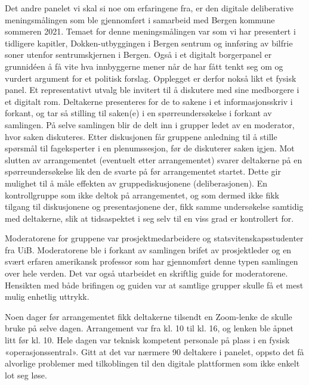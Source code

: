 \documentclass[
  12pt,
  a4paper, 12pt]{article}
\begin{document}
Det andre panelet vi skal si noe om erfaringene fra, er den digitale deliberative meningsmålingen som ble gjennomført i samarbeid med Bergen kommune sommeren 2021. Temaet for denne meningsmålingen var som vi har presentert i tidligere kapitler, Dokken-utbyggingen i Bergen sentrum og innføring av bilfrie soner utenfor sentrumskjernen i Bergen. Også i et digitalt borgerpanel er grunnidéen å få vite hva innbyggerne mener når de har fått tenkt seg om og vurdert argument for et politisk forslag. Opplegget er derfor nokså likt et fysisk panel. Et representativt utvalg ble invitert til å diskutere med sine medborgere i et digitalt rom. Deltakerne presenteres for de to sakene i et informasjonsskriv i forkant, og tar så stilling til saken(e) i en spørreundersøkelse i forkant av samlingen. På selve samlingen blir de delt inn i grupper ledet av en moderator, hvor saken diskuteres. Etter diskusjonen får gruppene anledning til å stille spørsmål til fageksperter i en plenumssesjon, før de diskuterer saken igjen. Mot slutten av arrangementet (eventuelt etter arrangementet) svarer deltakerne på en spørreundersøkelse lik den de svarte på før arrangementet startet. Dette gir mulighet til å måle effekten av gruppediskusjonene (deliberasjonen). En kontrollgruppe som ikke deltok på arrangementet, og som dermed ikke fikk tilgang til diskusjonene og presentasjonene der, fikk samme undersøkelse samtidig med deltakerne, slik at tidsaspektet i seg selv til en viss grad er kontrollert for.

Moderatorene for gruppene var prosjektmedarbeidere og statsvitenskapsstudenter fra UiB. Moderatorene ble i forkant av samlingen brifet av prosjektleder og en svært erfaren amerikansk professor som har gjennomført denne typen samlingen over hele verden. Det var også utarbeidet en skriftlig guide for moderatorene. Hensikten med både brifingen og guiden var at samtlige grupper skulle få et mest mulig enhetlig uttrykk.

Noen dager før arrangementet fikk deltakerne tilsendt en Zoom-lenke de skulle bruke på selve dagen. Arrangement var fra kl. 10 til kl. 16, og lenken ble åpnet litt før kl. 10. Hele dagen var teknisk kompetent personale på plass i en fysisk «operasjonssentral». Gitt at det var nærmere 90 deltakere i panelet, oppsto det få alvorlige problemer med tilkoblingen til den digitale plattformen som ikke enkelt lot seg løse.
\end{document}
